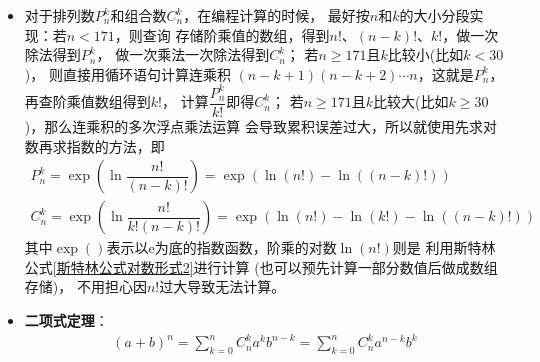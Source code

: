 \begin{itemize}[leftmargin=\inteval{\myitemleftmargin}pt,itemsep=
   \inteval{\myitemitempsep}pt,topsep=\inteval{\myitemtopsep}pt]
\item 对于排列数$P_n^k$和组合数$C_n^k$，在编程计算的时候，
最好按$n$和$k$的大小分段实现：若$n<171$，则查询
存储阶乘值的数组，得到$n!$、$(n-k)! $、$ k!$，做一次除法得到$P_n^k$，
做一次乘法一次除法得到$C_n^k$；
若$n\geq 171$且$k$比较小(比如$k<30$)，
则直接用循环语句计算连乘积
$(n-k+1)(n-k+2)\cdots n$，这就是$P_n^k$，再查阶乘值数组得到$k!$，
计算$\dfrac{P_n^k}{k!}$即得$C_n^k$；
若$n\geq 171$且$k$比较大(比如$k\geq 30$)，那么连乘积的多次浮点乘法运算
会导致累积误差过大，所以就使用先求对数再求指数的方法，即
\begin{gather*}
    P_n^k=\exp{\left(\ln \dfrac{n!}{(n-k)!}\right)}=\exp{(\ln(n!)-\ln((n-k)!))} \\
    C_n^k=\exp{\left(\ln \dfrac{n!}{k!(n-k)!}\right)}=\exp{(\ln(n!)-\ln(k!)-\ln((n-k)!))}
\end{gather*}
其中$\exp()$表示以e为底的指数函数，阶乘的对数$\ln(n!)$则是
利用斯特林公式\eqref{斯特林公式对数形式2}进行计算
(也可以预先计算一部分数值后做成数组存储)，
不用担心因$n!$过大导致无法计算。
    
\item \textbf{二项式定理}：
\begin{gather}\label{二项式定理(a+b)^n展开}
    (a+b)^n=\sum\limits_{k=0}^nC_n^ka^kb^{n-k}=
    \sum\limits_{k=0}^nC_n^ka^{n-k}b^k
\end{gather}


\end{itemize}

